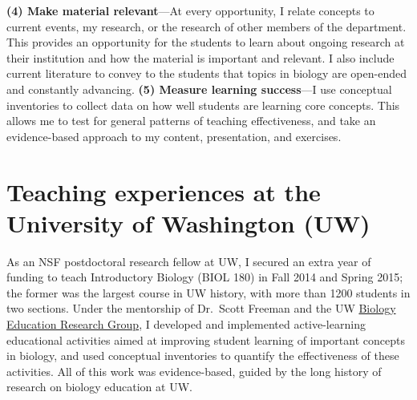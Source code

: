 \textbf{(4) Make material relevant}---At every opportunity, I relate concepts
to current events, my research, or the research of other members of the
department.
This provides an opportunity for the students to learn about ongoing
research at their institution and how the material is important and relevant.
I also include current literature to convey to the students that topics in
biology are open-ended and constantly advancing.
\textbf{(5) Measure learning success}---I use conceptual inventories to
collect
data on how well students are learning core concepts.
This allows me to test for general patterns of teaching effectiveness, and take
an evidence-based approach to my content, presentation, and exercises.

\section*{Teaching experiences at the University of Washington (UW)}
As an NSF postdoctoral research fellow at UW,
I secured an extra year of funding to teach
Introductory Biology
(BIOL 180) in Fall 2014 and Spring 2015;
the former was the largest course in UW history, with more than 1200 students
in two sections.
Under the mentorship of Dr.\ Scott Freeman and the UW
\href{https://sites.google.com/site/uwbioedresgroup/home}{Biology Education
    Research Group}, I developed and implemented active-learning
educational activities aimed at improving student learning of important
concepts in biology,
and used conceptual inventories to quantify the effectiveness of these
activities.
All of this work was evidence-based, guided by the long history of research on
biology education at UW.

